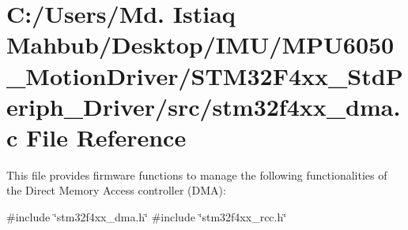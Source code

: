 \section{C\+:/\+Users/\+Md. Istiaq Mahbub/\+Desktop/\+I\+M\+U/\+M\+P\+U6050\+\_\+\+Motion\+Driver/\+S\+T\+M32\+F4xx\+\_\+\+Std\+Periph\+\_\+\+Driver/src/stm32f4xx\+\_\+dma.c File Reference}
\label{stm32f4xx__dma_8c}


This file provides firmware functions to manage the following functionalities of the Direct Memory Access controller (D\+MA)\+:  


{\ttfamily \#include \char`\"{}stm32f4xx\+\_\+dma.\+h\char`\"{}}\newline
{\ttfamily \#include \char`\"{}stm32f4xx\+\_\+rcc.\+h\char`\"{}}\newline
